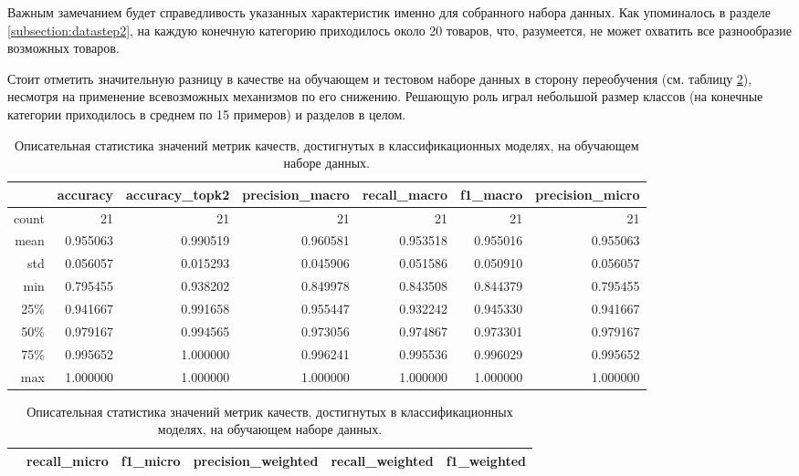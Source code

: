 \documentclass[a4paper,12pt]{extarticle}
\begin{document}
Важным замечанием будет справедливость указанных характеристик именно для собранного набора данных. Как упоминалось в разделе \ref{subsection:datastep2}, на каждую конечную категорию приходилось около 20 товаров, что, разумеется, не может охватить все разнообразие возможных товаров.

Стоит отметить значительную разницу в качестве на обучающем и тестовом наборе данных в сторону переобучения (см. таблицу \ref{table:metrics_statictics_train}), несмотря на применение всевозможных механизмов по его снижению. Решающую роль играл небольшой размер классов (на конечные категории приходилось в среднем по 15 примеров) и разделов в целом.

\begin{table}[ht]
	\caption{Описательная статистика значений метрик качеств, достигнутых в классификационных моделях, на обучающем наборе данных.} 
	\label{table:metrics_statictics_train}
	\footnotesize
	\centering
	\begin{tabular}{r|rrrrrr}
		\toprule
		{} & \multicolumn{1}{c}{accuracy} & \multicolumn{1}{c}{accuracy\_topk2} & \multicolumn{1}{c}{precision\_macro} & \multicolumn{1}{c}{recall\_macro} & \multicolumn{1}{c}{f1\_macro} & \multicolumn{1}{c}{precision\_micro}\\
		\midrule
		count &	21 & 21 & 21 & 21 & 21 & 21\\
		mean  & 0.955063 & 0.990519 & 0.960581 & 0.953518 & 0.955016 & 0.955063\\
		std   & 0.056057  & 0.015293 & 0.045906 & 0.051586 & 0.050910 & 0.056057\\
		min   &	0.795455 & 0.938202 & 0.849978 & 0.843508 & 0.844379 & 0.795455\\
		25\%  &	0.941667 & 0.991658 & 0.955447 & 0.932242 & 0.945330 & 0.941667\\
		50\%  &	0.979167 & 0.994565 & 0.973056 & 0.974867 & 0.973301 & 0.979167\\
		75\%  &	0.995652 & 1.000000 & 0.996241 & 0.995536 & 0.996029 & 0.995652\\
		max   &	1.000000 & 1.000000 & 1.000000 & 1.000000 & 1.000000 & 1.000000\\
		\bottomrule
	\end{tabular}
	\begin{tabular}{r|rrrrr}
		\toprule
		{} & \multicolumn{1}{c}{recall\_micro} & \multicolumn{1}{c}{f1\_micro} & \multicolumn{1}{c}{precision\_weighted} & \multicolumn{1}{c}{recall\_weighted} & \multicolumn{1}{c}{f1\_weighted}\\
		\midrule

\end{tabular}
\end{table}
\end{document}
